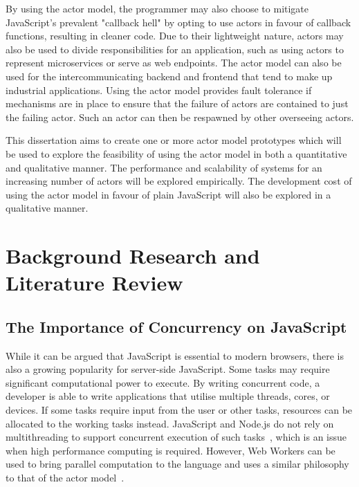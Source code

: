 \documentclass[12pt]{report}
\begin{document}
By using the actor model, the programmer may also choose to mitigate JavaScript's prevalent "callback hell" by opting to use actors in favour of callback functions, resulting in cleaner code. Due to their lightweight nature, actors may also be used to divide responsibilities for an application, such as using actors to represent microservices or serve as web endpoints\cite{hewitt2010actor}.  The actor model can also be used for the intercommunicating backend and frontend that tend to make up industrial applications. Using the actor model provides fault tolerance if mechanisms are in place to ensure that the failure of actors are contained to just the failing actor. Such an actor can then be respawned by other overseeing actors.

This dissertation aims to create one or more actor model prototypes which will be used to explore the feasibility of using the actor model in both a quantitative and qualitative manner. The performance and scalability of systems for an increasing number of actors will be explored empirically. The development cost of using the actor model in favour of plain JavaScript will also be explored in a qualitative manner.
\section{Background Research and Literature Review}
\subsection{The Importance of Concurrency on JavaScript}
While it can be argued that JavaScript is essential to modern browsers, there is also a growing popularity for server-side JavaScript. Some tasks may require significant computational power to execute. By writing concurrent code, a developer is able to write applications that utilise multiple threads, cores, or devices. If some tasks require input from the user or other tasks, resources can be allocated to the working tasks instead. JavaScript and Node.js do not rely on multithreading to support concurrent execution of such tasks~\cite{highperformance}, which is an issue when high performance computing is required. However, Web Workers can be used to bring parallel computation to the language and uses a similar philosophy to that of the actor model~\cite{concurrencyjs}.
\end{document}
